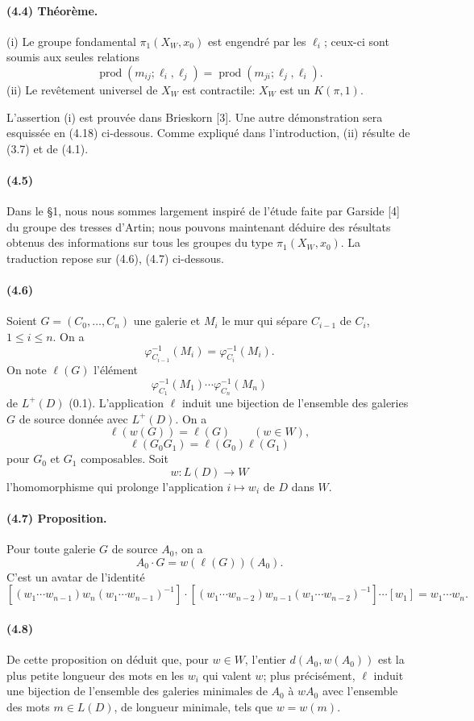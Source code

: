 \documentclass[10pt,a4paper]{article}
\newcommand{\prodalt}{\operatorname{prod}}
\begin{document}
\paragraph{(4.4) Théorème.} (i) Le groupe fondamental \(\pi_1(X_W,x_0)\) est engendré par les \(\ell_i\); ceux-ci sont soumis aux seules relations
\[
\tag{4.4.1}
\prodalt(m_{ij};\ell_i,\ell_j)=\prodalt(m_{ji};\ell_j,\ell_i).
\]
(ii) Le revêtement universel de \(X_W\) est contractile: \(X_W\) est un \(K(\pi,1)\).

L'assertion (i) est prouvée dans Brieskorn [3]. Une autre démonstration sera esquissée en (4.18) ci-dessous. Comme expliqué dans l'introduction, (ii) résulte de (3.7) et de (4.1).

\paragraph{(4.5)} Dans le §1, nous nous sommes largement inspiré de l'étude faite par Garside [4] du groupe des tresses d'Artin; nous pouvons maintenant déduire des résultats obtenus des informations sur tous les groupes du type \(\pi_1(X_W,x_0)\). La traduction repose sur (4.6), (4.7) ci-dessous.

\paragraph{(4.6)} Soient \(G=(C_0,\ldots,C_n)\) une galerie et \(M_i\) le mur qui sépare \(C_{i-1}\) de \(C_i\), \(1\le i\le n\). On a
\[
\varphi^{-1}_{C_{i-1}}(M_i)=\varphi^{-1}_{C_i}(M_i).
\]
On note \(\ell(G)\) l'élément
\[
\varphi^{-1}_{C_1}(M_1)\cdots \varphi^{-1}_{C_n}(M_n)
\]
de \(L^+(D)\) (0.1). L'application \(\ell\) induit une bijection de l'ensemble des galeries \(G\) de source donnée avec \(L^+(D)\). On a
\[
\tag{4.6.1}
\ell(w(G))=\ell(G)\qquad(w\in W),
\]
\[
\tag{4.6.2}
\ell(G_0G_1)=\ell(G_0)\ell(G_1)
\]
pour \(G_0\) et \(G_1\) composables. Soit
\[
w:L(D)\longrightarrow W
\]
l'homomorphisme qui prolonge l'application \(i\mapsto w_i\) de \(D\) dans \(W\).

\paragraph{(4.7) Proposition.} Pour toute galerie \(G\) de source \(A_0\), on a
\[
A_0\cdot G=w(\ell(G))(A_0).
\]
C'est un avatar de l'identité
\[
[(w_1\cdots w_{n-1})w_n(w_1\cdots w_{n-1})^{-1}]\cdot
[(w_1\cdots w_{n-2})w_{n-1}(w_1\cdots w_{n-2})^{-1}]
\cdots [w_1]=w_1\cdots w_n.
\]

\paragraph{(4.8)} De cette proposition on déduit que, pour \(w\in W\), l'entier \(d(A_0,w(A_0))\) est la plus petite longueur des mots en les \(w_i\) qui valent \(w\); plus précisément, \(\ell\) induit une bijection de l'ensemble des galeries minimales de \(A_0\) à \(wA_0\) avec l'ensemble des mots \(m\in L(D)\), de longueur minimale, tels que \(w=w(m)\).
\end{document}
